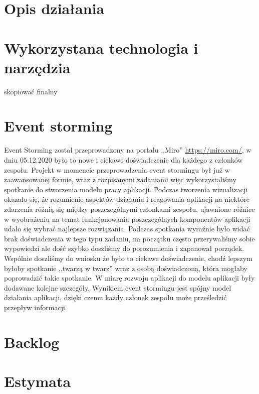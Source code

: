 \documentclass[12pt,a4paper]{article}
\begin{document}
	\section{Opis działania}
	\newpage
	
	\section{Wykorzystana technologia i narzędzia}
	\indent skopiować finalny
	\newpage

	\section{Event storming}
		\indent Event Storming został przeprowadzony na portalu ,,Miro'' \url{https://miro.com/}, w dniu 05.12.2020 było to nowe i ciekawe doświadczenie dla każdego z członków zespołu.
		Projekt w momencie przeprowadzenia event stormingu był już w zaawansowanej formie, wraz z rozpisanymi zadaniami więc wykorzystaliśmy spotkanie
		do stworzenia modelu pracy aplikacji. Podczas tworzenia wizualizacji okazało się, że rozumienie aspektów działania i reagowania aplikacji na niektóre zdarzenia
		różnią się między poszczególnymi członkami zespołu, ujawnione różnice w wyobrażeniu na temat funkcjonowania poszczególnych komponentów aplikacji udało się wybrać
		najlepsze rozwiązania. Podczas spotkania wyraźnie było widać brak doświadczenia w tego typu zadaniu, na początku często przerywaliśmy sobie wypowiedzi ale dość szybko
		doszliśmy do porozumienia i zapanował porządek. Wspólnie doszliśmy do wniosku że było to ciekawe doświadczenie, chodź lepszym byłoby spotkanie ,,twarzą w twarz''
		wraz z osobą doświadczoną, która mogłaby poprowadzić takie spotkanie. W miarę rozwoju aplikacji do modelu aplikacji były dodawane kolejne szczegóły. 
		Wynikiem event stormingu jest spójny model działania aplikacji, dzięki czemu każdy członek zespołu może prześledzić przepływ informacji.  
	\newpage
	
	\section{Backlog}
	\newpage
	
	\section{Estymata}
	\newpage
\end{document}
